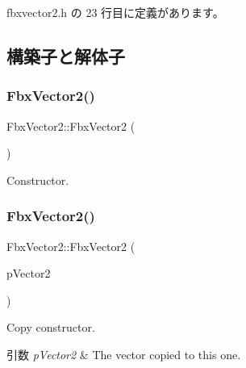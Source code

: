  fbxvector2.\+h の 23 行目に定義があります。



\subsection{構築子と解体子}
\mbox{\label{class_fbx_vector2_afb0716473e400a06bd41f337d5d9d8d2}} 
\subsubsection{\texorpdfstring{Fbx\+Vector2()}{FbxVector2()}\hspace{0.1cm}{\footnotesize\ttfamily [1/3]}}
{\footnotesize\ttfamily Fbx\+Vector2\+::\+Fbx\+Vector2 (\begin{DoxyParamCaption}{ }\end{DoxyParamCaption})}



Constructor. 

\mbox{\label{class_fbx_vector2_ae3e34456e4fbf24627590da182d3489f}} 
\subsubsection{\texorpdfstring{Fbx\+Vector2()}{FbxVector2()}\hspace{0.1cm}{\footnotesize\ttfamily [2/3]}}
{\footnotesize\ttfamily Fbx\+Vector2\+::\+Fbx\+Vector2 (\begin{DoxyParamCaption}\item[{const \hyperlink{class_fbx_vector2}{Fbx\+Vector2} \&}]{p\+Vector2 }\end{DoxyParamCaption})}

Copy constructor. 
\begin{DoxyParams}{引数}
{\em p\+Vector2} & The vector copied to this one. \\
\hline
\end{DoxyParams}
\mbox{\label{class_fbx_vector2_ae2d1e80f75a1566de936cfa8532a49b3}} 
